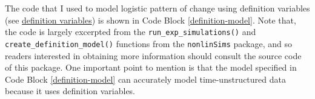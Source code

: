 \documentclass[
12pt, %
twoside,
english]{guelphthesis}
\begin{document}
\label{def-model-code}

The code that I used to model logistic pattern of change using definition variables (see \protect\hyperlink{definition-variables}{definition variables}) is shown in Code Block \ref{definition-model}. Note that, the code is largely excerpted from the \texttt{run\_exp\_simulations()} and \texttt{create\_definition\_model()} functions from the \texttt{nonlinSims} package, and so readers interested in obtaining more information should consult the source code of this package. One important point to mention is that the model specified in Code Block \ref{definition-model} can accurately model time-unstructured data because it uses definition variables.

\restoreparindent\label{definition-model}
\end{document}
